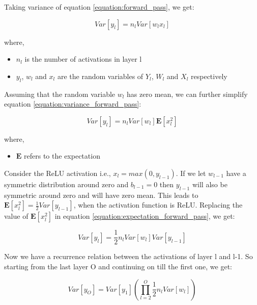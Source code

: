 Taking variance of equation \ref{equation:forward_pass}, we get:

\begin{equation}
    \label{equation:variance_forward_pass}
    Var[y_l] = n_l Var[w_lx_l]
\end{equation}

where,
\begin{itemize}[label={}]
  \setlength\itemsep{0em}
  \item $n_l$ is the number of activations in layer l
  \item $y_l$, $w_l$ and $x_l$ are the random variables of $Y_l$, $W_l$ and $X_l$ respectively
\end{itemize}

Assuming that the random variable $w_l$ has zero mean, we can further simplify equation \ref{equation:variance_forward_pass}:

\begin{equation}
    \label{equation:expectation_forward_pass}
    Var[y_l] = n_l Var[w_l]\mathbf{E}[x_l^2]
\end{equation}

where,
\begin{itemize}[label={}]
  \setlength\itemsep{0em}
  \item $\mathbf{E}$ refers to the expectation
\end{itemize}

Consider the ReLU activation i.e., $x_l = max(0, y_{l-1})$. If we let $w_{l-1}$ have a symmetric distribution around zero and $b_{l-1} = 0$ then $y_{l-1}$ will also be symmetric around zero and will have zero mean. This leads to $\mathbf{E}[x_l^2] = \frac{1}{2}Var[y_{l-1}]$, when the activation function is ReLU. Replacing the value of $\mathbf{E}[x_l^2]$ in equation \ref{equation:expectation_forward_pass}, we get:

\begin{equation}
    \label{equation:replaced_expectation_forward_pass}
    Var[y_l] = \frac{1}{2}n_l Var[w_l]Var[y_{l-1}]
\end{equation}

Now we have a recurrence relation between the activations of layer l and l-1. So starting from the last layer O and continuing on till the first one, we get:

\begin{equation}
    \label{equation:final_layers_forward_pass}
    Var[y_O] = Var[y_1] \left( \prod_{l=2}^{O} \frac{1}{2}n_l Var[w_l] \right)
\end{equation}

